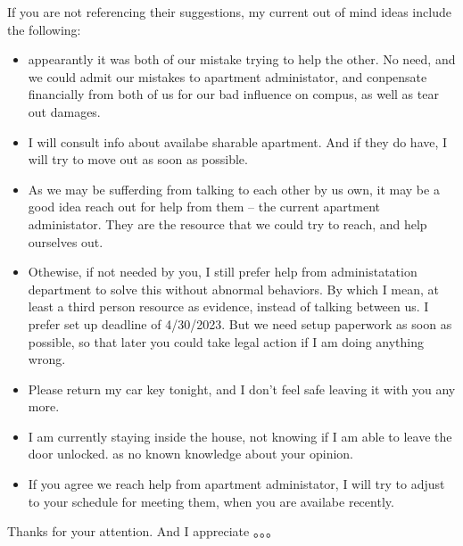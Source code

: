 \documentclass[9pt, b5paper]{article}
\begin{document}
If you are not referencing their suggestions, my current out of mind ideas include the following: 

\begin{itemize}
\item appearantly it was both of our mistake trying to help the other. No need, and we could admit our mistakes to apartment administator, and conpensate financially from both of us for our bad influence on compus, as well as tear out damages.

\item I will consult info about availabe sharable apartment. And if they do have, I will try to move out as soon as possible.

\item As we may be sufferding from talking to each other by us own, it may be a good idea reach out for help from them -- the current apartment administator. They are the resource that we could try to reach, and help ourselves out.

\item Othewise, if not needed by you, I still prefer help from administatation department to solve this without abnormal behaviors. By which I mean, at least a third person resource as evidence, instead of talking between us. I prefer set up deadline of 4/30/2023. But we need setup paperwork as soon as possible, so that later you could take legal action if I am doing anything wrong.

\item Please return my car key tonight, and I don't feel safe leaving it with you any more.

\item I am currently staying inside the house, not knowing if I am able to leave the door unlocked. as no known knowledge about your opinion.

\item If you agree we reach help from apartment administator, I will try to adjust to your schedule for meeting them, when you are availabe recently.
\end{itemize}

Thanks for your attention. And I appreciate 。。。
\end{document}
